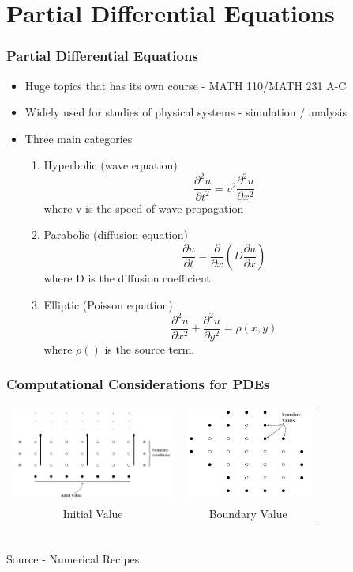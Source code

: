 \documentclass[10pt]{beamer}
\begin{document}
\section{Partial Differential Equations}
\label{sec:part-diff-equat}

\begin{frame}
  \frametitle{Partial Differential Equations}
  \begin{itemize}
  \item Huge topics that has its own course - MATH 110/MATH 231 A-C
  \item Widely used for studies of physical systems - simulation / analysis
  \item Three main categories
    \begin{enumerate}
    \item Hyperbolic (wave equation)
      \[
        \frac{\partial^2 u}{\partial t^2} = v^2 \frac{\partial^2 u}{\partial x^2}
      \] where v is the speed of wave propagation
    \item Parabolic (diffusion equation)
      \[
        \frac{\partial u}{\partial t} = \frac{\partial}{\partial x}\left( D \frac{\partial  u}{\partial x} \right)
      \]
      where D is the diffusion coefficient
    \item Elliptic (Poisson equation)
      \[
        \frac{\partial^2 u }{\partial x^2} +  \frac{\partial^2 u }{\partial y^2} = \rho(x,y)
      \]
      where $\rho()$ is the source term. 
    \end{enumerate}
  \end{itemize}
\end{frame}

\begin{frame}
  \frametitle{Computational Considerations for PDEs}
  \begin{center}
    \begin{tabular}{cc}
      \includegraphics[height=3cm]{initial-value}&
      \includegraphics[height=3cm]{boundary-value}\\
      Initial Value & Boundary Value\\
    \end{tabular}  
  \end{center}

  ~\\[1cm]
  Source - Numerical Recipes. 
\end{frame}
\end{document}
